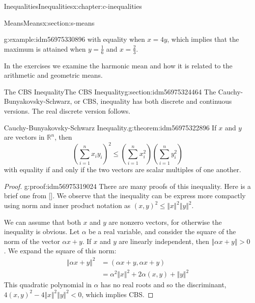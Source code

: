 \documentclass[twoside,10pt,]{book}
\newcommand{\xreffont}{\relax}
\numberwithin{equation}{section}
\newcommand{\lt}{<}
\newcommand{\gt}{>}
\begin{document}
\begin{chapterptx}{Inequalities}{}{Inequalities}{}{}{x:chapter:c-inequalities}
\begin{sectionptx}{Means}{}{Means}{}{}{x:section:s-means}
\begin{example}{}{g:example:idm56975330896}
with equality when \(x=4y\), which implies that the maximum is attained when \(y=\frac{1}{6}\) and \(x=\frac{2}{3}\).%
\end{example}
In the exercises we examine the harmonic mean and how it is related to the arithmetic and geometric means.%
\end{sectionptx}
%
%
\typeout{************************************************}
\typeout{************************************************}
%
\begin{sectionptx}{The CBS Inequality}{}{The CBS Inequality}{}{}{g:section:idm56975324464}
The Cauchy-Bunyakovsky-Schwarz, or CBS, inequality has both discrete and continuous versions.  The real discrete version follows.%
\begin{theorem}{Cauchy-Bunyakovsky-Schwarz Inequality.}{}{g:theorem:idm56975322896}%
%
%
If \(x\) and \(y\) are vectors in \(\mathbb{R}^n\), then%
\begin{equation}
\left(\sum _{i=1}^n x_i y_i\right)^2\leq \left(\sum _{i=1}^n x_i^2\right)\left(
\sum _{i=1}^n y_i^2\right)\label{x:men:eq-cbs}
\end{equation}
with equality if and only if the two vectors are scalar multiples of one another.%
\end{theorem}
\begin{proof}{}{g:proof:idm56975319024}
There are many proofs of this inequality.  Here is a brief one from \hyperlink{x:biblio:biblio-aigner}{[{\xreffont 1}]}. We observe that the inequality can be express more compactly using norm and inner product notation as \((x, y)^2 \leq \left\Vert x \right\Vert^2 \left\Vert y \right\Vert^2 \).%
\par
We can assume that both \(x\) and \(y\) are nonzero vectors, for otherwise the inequality is obvious.  Let \(\alpha\) be a real variable, and consider the square of the norm of the vector \(\alpha x + y\).  If \(x\) and \(y\) are linearly independent, then \(\left\Vert \alpha x + y\right\Vert \gt 0\).  We expand the square of this norm:%
\begin{equation*}
\begin{split}
\left\Vert \alpha x + y \right\Vert^2 &= (\alpha x + y,\alpha x + y)\\
&  = \alpha^2 \left\Vert x \right\Vert^2 + 2 \alpha (x, y) + \left\Vert y \right\Vert^2
\end{split}
\end{equation*}
This quadratic polynomial in \(\alpha\) has no real roots and so the discriminant, \(4 (x, y)^2 - 4\left\Vert x \right\Vert^2 \left\Vert y \right\Vert^2 \lt 0\), which implies CBS.%

\end{proof}
\end{sectionptx}
\end{chapterptx}
\end{document}
